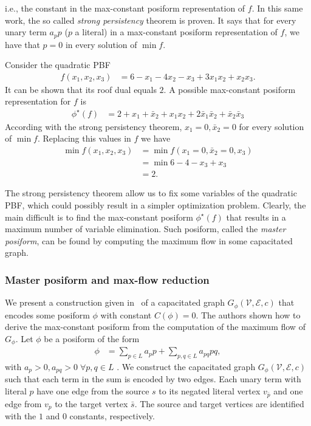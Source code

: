 %
i.e., the constant in the max-constant posiform representation of $f$. In this same work, the so called \emph{strong persistency} theorem is proven. It says that for every unary term $a_pp$ ($p$ a literal) in a max-constant posiform representation of $f$, we have that $p=0$ in every solution of $\min f$.
%
\begin{example}
Consider the quadratic PBF 
\begin{align*}
	f(x_1,x_2,x_3) &= 6-x_1-4x_2-x_3+3x_1x_2+x_2x_3.
\end{align*}
%
It can be shown that its roof dual equals $2$. A possible max-constant posiform representation for $f$ is
\begin{align*}
	\phi^{\star}(f) &= 2 + x_1 + \bar{x}_2 + x_1x_2 +2\bar{x}_1\bar{x}_2 + \bar{x}_2\bar{x}_3
\end{align*}
%
According with the strong persistency theorem, $x_1=0,\bar{x}_2=0$ for every solution of $\min f$. Replacing this values in $f$ we have
\begin{align*}
	\min f(x_1,x_2,x_3) &=\min f(x_1=0,\bar{x}_2=0,x_3) \\
	&= \min 6 - 4 - x_3 + x_3 \\
	&= 2.
\end{align*}
\end{example}
%
The strong persistency theorem allow us to fix some variables of the quadratic PBF, which could possibly result in a simpler optimization problem. Clearly, the main difficult is to find the max-constant posiform $\phi^{\star}(f)$ that results in a maximum number of variable elimination. Such posiform, called the \emph{master posiform}, can be found by computing the maximum flow in some capacitated graph.

\subsubsection{Master posiform and max-flow reduction}

We present a construction given in~\cite{boros91,boros02pseudo} of a capacitated graph $G_{\phi}(\mathcal{V},\mathcal{E},c)$ that encodes some posiform $\phi$ with constant $C(\phi)=0$. The authors shown how to derive the max-constant posiform from the computation of the maximum flow of $G_{\phi}$. Let $\phi$ be a posiform of the form
	\begin{align*}
		\phi &= \sum_{p \in L}{a_pp} + \sum_{p,q \in L}{a_{pq}pq},
	\end{align*}
%
with $a_p >0, a_{pq}>0\; \forall p,q \in L$	. We  construct the capacitated graph $G_{\phi}(\mathcal{V},\mathcal{E},c)$ such that each term in the sum is encoded by two edges. Each unary term with literal $p$ have one edge from the source $s$ to its negated literal vertex $v_{\bar{p}}$ and one edge from $v_p$ to the target vertex $\bar{s}$. The source and target vertices are identified with the $1$ and $0$ constants, respectively. 

